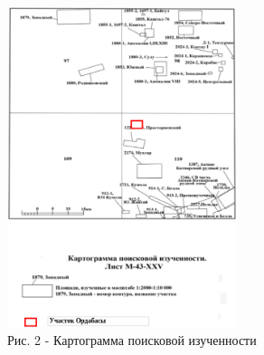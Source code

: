 \begin{figure}[H]
	\centering
	\includegraphics[width=0.6\textwidth]{media/gorn2/image17}
	\caption*{Рис. 2 - Картограмма поисковой изученности}
\end{figure}

